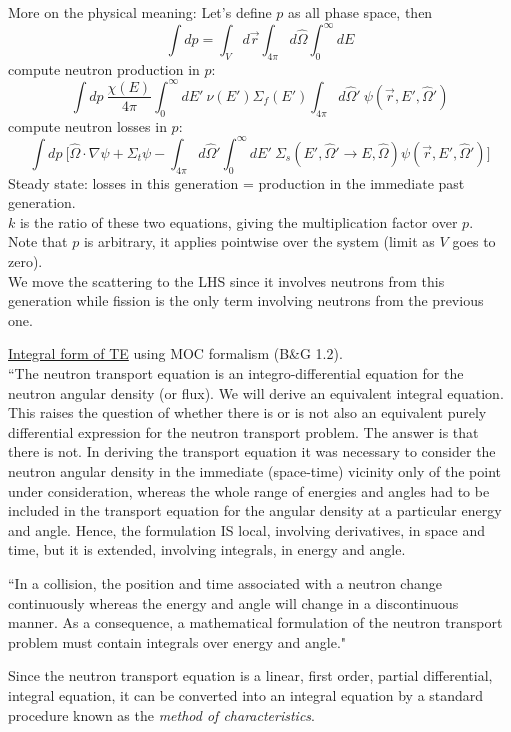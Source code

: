 \documentclass[12pt]{article}
\newcommand{\rvec}{\ensuremath{\vec{r}}}
\newcommand{\vOmega}{\ensuremath{\hat{\Omega}}}
\begin{document}
More on the physical meaning: Let's define $p$ as all phase space, then
  \[\int dp = \int_{V} d\rvec \int_{4 \pi} d\vOmega \int_0^{\infty} dE\]
compute neutron production in $p$:
  \[\int dp\:\frac{\chi(E)}{4 \pi}\int_0^{\infty} dE' \: \nu(E') \Sigma_f(E') \int_{4 \pi} d\vOmega' \:\psi(\vec{r}, E', \vOmega') \]
compute neutron losses in $p$:
  \[\int dp\:\biggl[\vOmega \cdot \nabla \psi + \Sigma_t \psi - \int_{4 \pi} d\vOmega' \int_0^{\infty} dE' \: \Sigma_s(E', \vOmega' \rightarrow E, \vOmega) \psi(\vec{r}, E', \vOmega') \biggr] \]
Steady state: losses in this generation = production in the immediate past generation.\\
$k$ is the ratio of these two equations, giving the multiplication factor over $p$.\\
Note that $p$ is arbitrary, it applies pointwise over the system (limit as $V$ goes to zero).\\
We move the scattering to the LHS since it involves neutrons from this generation while fission is the only term involving neutrons from the previous one.


\clearpage
\underline{Integral form of TE} using MOC formalism (B\&G 1.2).\\
``The neutron transport equation is an integro-differential equation for the
neutron angular density (or flux). We will derive an equivalent integral equation. This raises the question of whether there is or is not also an
equivalent purely differential expression for the neutron transport problem.
The answer is that there is not. In deriving the transport
equation it was necessary to consider the neutron angular density in the 
immediate (space-time) vicinity only of the point under consideration, whereas the
whole range of energies and angles had to be included in the transport equation
for the angular density at a particular energy and angle. Hence, the formulation
IS local, involving derivatives, in space and time, but it is extended, involving
integrals, in energy and angle.

``In a collision, the position
and time associated with a neutron change continuously whereas the energy and
angle will change in a discontinuous manner. As a consequence, a mathematical
formulation of the neutron transport problem must contain integrals over energy
and angle."

Since the neutron transport equation is a linear, first order, partial differential,
integral equation, it can be converted into an integral equation by a standard
procedure known as the \textit{method of characteristics}.
\end{document}
